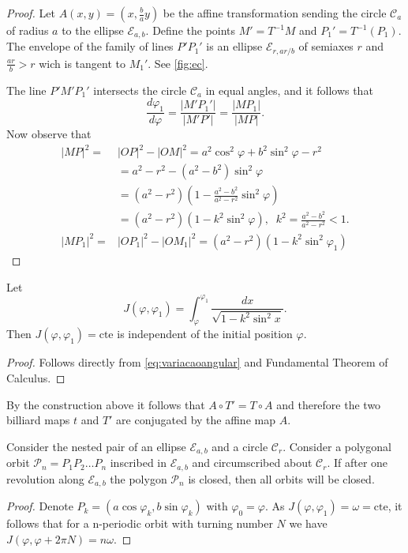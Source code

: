  \begin{proof}
 Let $A(x,y)=(x,\frac{b }{a} y)$ be the affine transformation sending the circle $\mathcal{C}_a$ of radius $a$ to the ellipse $\mathcal{E}_{a,b}.$ Define the points $M'=T^{-1}M$ and $P_1'=T^{-1}{(P_1)}$. The envelope of the family of  lines $P'P_1'$ is an ellipse $\mathcal{E}_{r,ar/b}$ of semiaxes $r$ and $\frac{ar}{b}>r$ wich is tangent to $M_1'$. See  \cref{fig:ec}. 
 
 The line $P'M'P_1'$ intersects the circle $\mathcal{C}_a$ in equal angles, and it follows that
 \[\frac{d\varphi_1}{d\varphi}=\frac{|M'P_1'|}{|M'P'|}=\frac{|MP_1|}{|MP|}.\]
    Now observe that
    \begin{align*}
    |MP|^2=&|OP|^2-|OM|^2 = a^2\cos^2\varphi+b^2\sin^2\varphi-r^2\\
    &=a^2-r^2-(a^2-b^2)\sin^2\varphi\\
    &=(a^2-r^2)\left(1-\frac{a^2-b^2}{a^2-r^2}\sin^2\varphi\right)\\
    &=(a^2-r^2)(1-k^2\sin^2\varphi),\;\;k^2=\frac{a^2-b^2}{a^2-r^2}<1.\\
     |MP_1|^2=&|OP_1|^2-|OM_1|^2=(a^2-r^2)\left(1-k^2\sin^2\varphi_1\right)
    \end{align*}
 \end{proof}
 
 \begin{proposition} Let 
 \[J(\varphi,\varphi_1)=\int_{\varphi}^{\varphi_1}\frac{dx}{\sqrt{1-k^2\sin^2x}}.\]
 Then $J(\varphi,\varphi_1) =\text{cte}$ is independent of the initial position $\varphi.$
     
 \end{proposition}
 
 \begin{proof} Follows directly from   \cref{eq:variacaoangular} and Fundamental Theorem of Calculus.
 \end{proof}
 \begin{remark} By the construction above it follows that
$A\circ T'=T\circ A$ and therefore the two billiard maps $t$ and $T'$ are conjugated by the affine map $A$.
\end{remark}
 
    \begin{theorem} [Poncelet] Consider the nested pair of an ellipse $ \mathcal{E}_{a,b}$ and a circle $\mathcal{C}_r$. Consider a polygonal orbit $\mathcal{P}_n=P_1P_2\ldots P_n$ inscribed in $\mathcal{E}_{a,b}$ and circumscribed about $\mathcal{C}_r$. If after one revolution along $ \mathcal{E}_{a,b}$ the polygon $\mathcal{P}_n$ is closed, then all orbits will be closed.
    
\end{theorem}

\begin{proof} Denote $P_k=(a\cos\varphi_k,b\sin\varphi_k)$ with $\varphi_0=\varphi.$ As $J(\varphi,\varphi_1)=\omega=\text{cte}$, it follows that for a n-periodic orbit with turning number $N$ we have
$J(\varphi,\varphi+2\pi N)= n\omega$. 
\end{proof}

